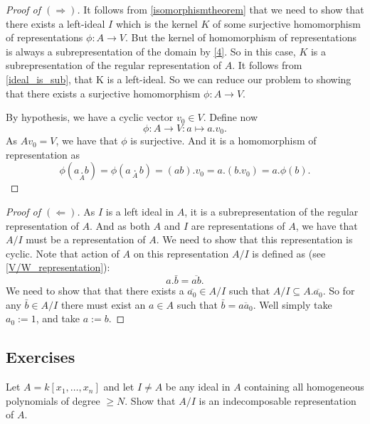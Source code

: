 \begin{proof}[Proof of $(\Longrightarrow )$] It follows from \ref{isomorphismtheorem} that we need to show that there exists a left-ideal \(I\) which is the kernel \(K\) of some surjective homomorphism of representations \(\phi :A\rightarrow V\). But the kernel of homomorphism of representations is always a subrepresentation of the domain by \ref{4}. So in this case, \(K\) is a  subrepresentation of the regular representation of \(A\). It follows from \ref{ideal_is_sub}, that K is a left-ideal. So we can reduce our problem to showing that there exists a surjective homomorphism \(\phi :A\rightarrow V\).

By hypothesis, we have a cyclic vector \(v_{0}\in V\). Define now
\[\phi :A\rightarrow V:a\mapsto a.v_{0}.\]
As \(Av_{0}=V\), we have that \(\phi \) is surjective. And it is a homomorphism of representation as
\[\phi (a\underset{A}{.}b)=\phi (a\underset{A}{\cdot }b)=(ab).v_{0}=a.(b.v_{0})=a.\phi (b).\]
\end{proof}

\begin{proof}[Proof of \((\Longleftarrow )\)] As \(I\) is a left ideal in \(A\), it is a subrepresentation of the regular representation of \(A\). And as both \(A\) and \(I\) are representations of \(A\), we have that \(A/I\) must be a representation of \(A\). We need to show that this representation is cyclic. Note that action of \(A\) on this representation \(A/I\) is defined as (see \ref{V/W_representation}):
\[a.\bar{b}=\overline{ab}.\]
We need to show that  that there exists a \(\overline{a_{0}}\in A/I\) such that \(A/I\subseteq A.\overline{a_{0}}\). So for any \(\bar{b}\in A/I\) there must exist an \(a\in A\) such that \(\bar{b}=\overline{aa_{0}}\). Well simply take \(a_{0}:=1\), and take \(a:=b\).
\end{proof}


\subsection*{Exercises}

\begin{prop}
Let \(A=k[x_{1},\ldots ,x_{n}]\) and let \(I\neq A\) be any ideal in \(A\) containing all homogeneous polynomials of degree \(\geq N\). Show that \(A/I\) is an indecomposable representation of \(A\).
\end{prop}

